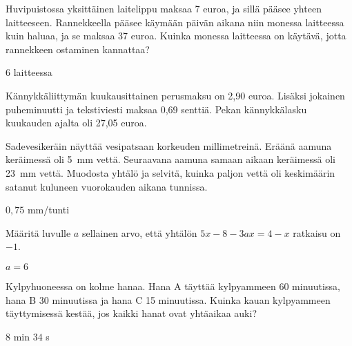 \begin{tehtavasivu}
\begin{tehtava}
Huvipuistossa yksittäinen laitelippu maksaa 7 euroa, ja sillä pääsee yhteen laitteeseen. Rannekkeella pääsee käymään päivän aikana niin monessa laitteessa kuin haluaa, ja se maksaa 37 euroa. Kuinka monessa laitteessa on käytävä, jotta rannekkeen ostaminen kannattaa?
\begin{vastaus}
$6$ laitteessa
\end{vastaus}
\end{tehtava}

\begin{tehtava}
Kännykkäliittymän kuukausittainen perusmaksu on 2,90 euroa. Lisäksi jokainen puheminuutti ja tekstiviesti maksaa 0,69 senttiä. Pekan kännykkälasku kuukauden
ajalta oli 27,05 euroa.

\begin{alakohdat}
\end{alakohdat}

	\begin{vastaus}
		\begin{alakohdat}
		\end{alakohdat}
	\end{vastaus}
\end{tehtava}

\begin{tehtava}
Sadevesikeräin näyttää vesipatsaan korkeuden millimetreinä. Eräänä aamuna
keräimessä oli 5~mm vettä. Seuraavana aamuna samaan aikaan keräimessä oli 23~mm vettä. Muodosta yhtälö ja selvitä, kuinka paljon vettä oli keskimäärin satanut kuluneen vuorokauden aikana tunnissa.
	\begin{vastaus}
	$0,75$ mm/tunti
	\end{vastaus}
\end{tehtava}

\begin{tehtava}
Määritä luvulle $a$ sellainen arvo, että yhtälön $5x-8-3ax=4-x$ ratkaisu on $-1$.
\begin{vastaus}
$a=6$
\end{vastaus}
\end{tehtava}

\begin{tehtava}
Kylpyhuoneessa on kolme hanaa. Hana A täyttää kylpyammeen 60 minuutissa, hana B 30 minuutissa ja hana C 15 minuutissa. Kuinka kauan kylpyammeen täyttymisessä kestää, jos kaikki hanat ovat yhtäaikaa auki?
\begin{vastaus}
$8$ min $34$ s
\end{vastaus}
\end{tehtava}

\end{tehtavasivu}
